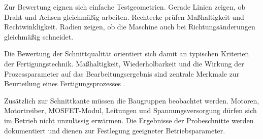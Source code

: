 Zur Bewertung eignen sich einfache Testgeometrien. Gerade Linien zeigen, ob Draht und Achsen gleichmäßig arbeiten. Rechtecke prüfen Maßhaltigkeit und Rechtwinkligkeit. Radien zeigen, ob die Maschine auch bei Richtungsänderungen gleichmäßig schneidet.

Die Bewertung der Schnittqualität orientiert sich damit an typischen Kriterien der Fertigungstechnik. Maßhaltigkeit, Wiederholbarkeit und die Wirkung der Prozessparameter auf das Bearbeitungsergebnis sind zentrale Merkmale zur Beurteilung eines Fertigungsprozesses \cite{Fritz:2022}.

Zusätzlich zur Schnittkante müssen die Baugruppen beobachtet werden. Motoren, Motortreiber, MOSFET-Modul, Leitungen und Spannungsversorgung dürfen sich im Betrieb nicht unzulässig erwärmen. Die Ergebnisse der Probeschnitte werden dokumentiert und dienen zur Festlegung geeigneter Betriebsparameter.

